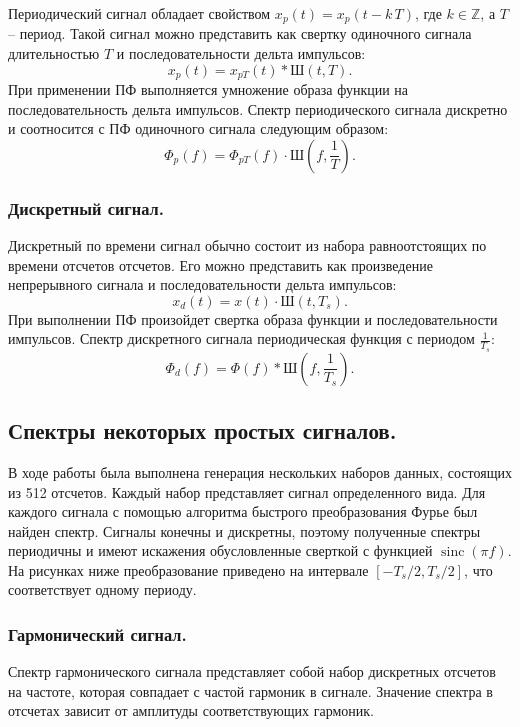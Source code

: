 \documentclass[a4paper,14pt]{extarticle}
\DeclareMathOperator{\sinc}{sinc}
\begin{document}
Периодический сигнал обладает свойством $x_p(t) = x_p(t - k\,T)$, где $ k \in \mathbb{Z}$, а $T$ -- период. Такой сигнал можно представить как свертку одиночного сигнала длительностью $T$ и последовательности дельта импульсов:
\begin{equation*}
x_p(t) = x_{pT}(t) * \text{Ш}(t, T).
\end{equation*}
При применении ПФ выполняется умножение образа функции на последовательность дельта импульсов. Спектр периодического сигнала дискретно и соотносится с ПФ одиночного сигнала следующим образом:
\begin{equation*}
\Phi_p(f) = \Phi_{pT}(f) \cdot \text{Ш}(f, \frac{1}{T}).
\end{equation*}

\subsubsection{Дискретный сигнал.}

Дискретный по времени сигнал обычно состоит из набора равноотстоящих по времени отсчетов отсчетов. Его можно представить как произведение непрерывного сигнала и последовательности дельта импульсов:
\begin{equation*}
x_d(t) = x(t) \cdot \text{Ш}(t, T_s).
\end{equation*}
При выполнении ПФ произойдет свертка образа функции и последовательности импульсов. Спектр дискретного сигнала периодическая функция с периодом $\frac{1}{T_s}$:
\begin{equation*}
\Phi_d(f) = \Phi(f) * \text{Ш}(f, \frac{1}{T_s}).
\end{equation*}

\subsection{Спектры некоторых простых сигналов.}

В ходе работы была выполнена генерация нескольких наборов данных, состоящих из 512 отсчетов. Каждый набор представляет сигнал определенного вида. Для каждого сигнала с помощью алгоритма быстрого преобразования Фурье был найден спектр. Сигналы конечны и дискретны, поэтому полученные спектры периодичны и имеют искажения обусловленные сверткой с функцией $\sinc(\pi f)$. На рисунках ниже преобразование приведено на интервале $[-T_s / 2, T_s/2]$, что соответствует одному периоду.  

\subsubsection{Гармонический сигнал.}
Спектр гармонического сигнала представляет собой набор дискретных отсчетов на частоте, которая совпадает с частой гармоник в сигнале. Значение спектра в отсчетах зависит от амплитуды соответствующих гармоник. 
\end{document}
